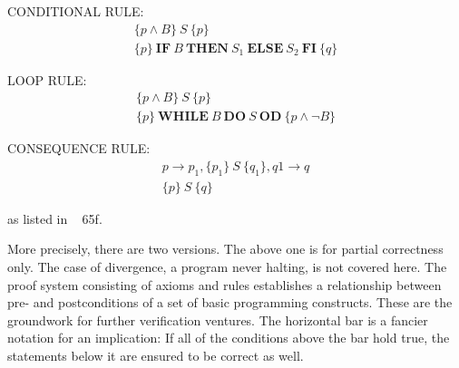 CONDITIONAL RULE:
\begin{equation}\label{eq:prove_pw_alt}
\begin{gathered}
	\{p\land B\}\ S\ \{p\} \\
	\hline
	\{p\}\ \mathbf{IF}\ B\ \mathbf{THEN}\ S_1\ \mathbf{ELSE}\ S_2\ \mathbf{FI}\ \{q\}
\end{gathered}
\end{equation}

LOOP RULE:
\begin{equation}\label{eq:prove_pw_loop}
\begin{gathered}
	\{p \land B\}\ S\ \{p\} \\
	\hline
	\{p\}\ \mathbf{WHILE}\ B\ \mathbf{DO}\ S\ \mathbf{OD}\ \{p \land \neg B\}
\end{gathered}
\end{equation}

CONSEQUENCE RULE:
\begin{equation}\label{eq:prove_pw_conseq}
\begin{gathered}
	p \to p_1,\{p_1\}\ S\ \{q_1\},q1 \to q \\
	\hline
	\{p\}\ S\ \{q\}
\end{gathered}
\end{equation}

as listed in ~\cite{apt2010verification} 65f.
\vspace*{0.5cm}

More precisely, there are two versions. The above one is for partial correctness only. The case of divergence, a program never halting, is not covered here. The proof system consisting of axioms and rules establishes a relationship between pre- and postconditions of a set of basic programming constructs. These are the groundwork for further verification ventures. The horizontal bar is a fancier notation for an implication: If all of the conditions above the bar hold true, the statements below it are ensured to be correct as well.

